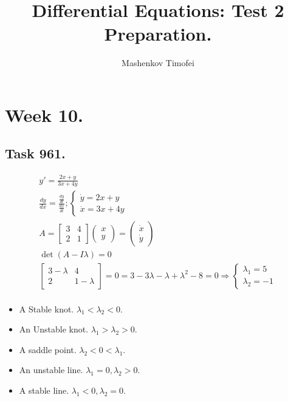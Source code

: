 \documentclass{article}
\title{Differential Equations: Test 2 Preparation.}
\author{Mashenkov Timofei}
\begin{document}
\maketitle{}

\section*{Week 10.}

\subsection*{Task 961.}

\addtolength{\jot}{1pt}
\begin{fleqn}[1\parindent]
  \begin{gather*}
    y' = \frac{2x+y}{3x+4y} \\ 
    \frac{dy}{dx} = \frac{\frac{dy}{dt}}{\frac{dx}{dt}}; \begin{cases}
      \dot{y} = 2x+y \\ 
      \dot{x} = 3x+4y
    \end{cases} \\
    A = 
    \begin{bmatrix}
      3 & 4 \\ 
      2 & 1
    \end{bmatrix}
    \begin{pmatrix}
      x \\ y
    \end{pmatrix}
    = 
    \begin{pmatrix}
      \dot{x} \\ \dot{y}
    \end{pmatrix} \\ 
    \det{(A - I\lambda)} = 0 \\ 
    \begin{bmatrix}
      3-\lambda & 4 \\
      2 & 1-\lambda
    \end{bmatrix}
    = 0 = 3 - 3\lambda - \lambda + \lambda^2-8 = 0 \Rightarrow \begin{cases}
      \lambda_1 = 5 \\ \lambda_2 = -1 
    \end{cases} \\
  \end{gather*}
\end{fleqn}

\begin{itemize}
  \item A Stable knot. $\lambda_1 < \lambda_2 < 0$.
  \item An Unstable knot. $\lambda_1 > \lambda_2 > 0$.
  \item A saddle point. $\lambda_2 < 0 < \lambda_1$.
  \item An unstable line. $\lambda_1=0, \lambda_2>0$.
  \item A stable line. $\lambda_1<0, \lambda_2=0$.
\end{itemize}
\end{document}
